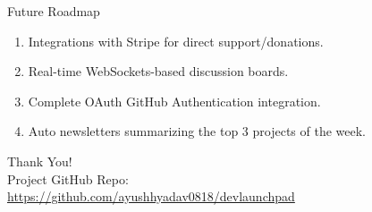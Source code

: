 \documentclass{beamer}
\begin{document}
\begin{frame}{Future Roadmap}
    \begin{enumerate}
        \item Integrations with Stripe for direct support/donations.
        \item Real-time WebSockets-based discussion boards.
        \item Complete OAuth GitHub Authentication integration.
        \item Auto newsletters summarizing the top 3 projects of the week.
    \end{enumerate}
\end{frame}

\begin{frame}
    \centering
    \Huge Thank You!\\
    \vspace{20px}
    \normalsize Project GitHub Repo: \\
    \url{https://github.com/ayushhyadav0818/devlaunchpad}
\end{frame}
\end{document}
